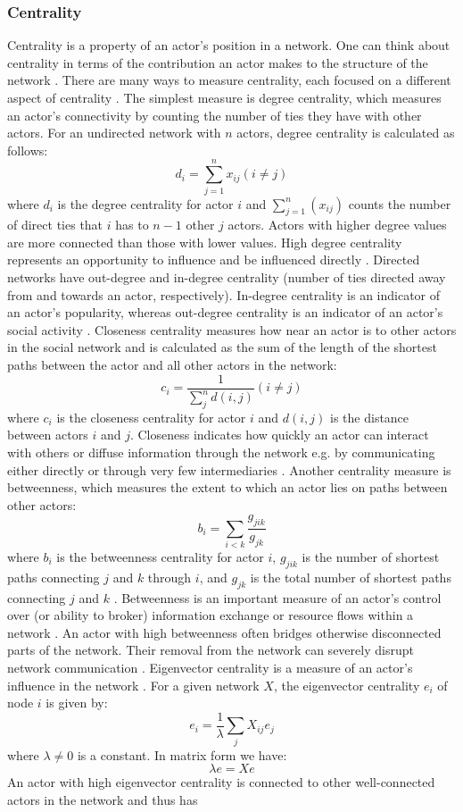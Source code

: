 \subsubsection{Centrality}

Centrality is a property of an actor's position in a network. One can think about centrality in terms of the contribution an actor makes to the structure of the network \citep{borgatti2013analyzing}. There are many ways to measure centrality, each focused on a different aspect of centrality \citep{freeman1979centrality}. The simplest measure is degree centrality, which measures an actor's connectivity by counting the number of ties they have with other actors. For an undirected network with \(n\) actors, degree centrality is calculated as follows: $$ d_i=\sum_{j=1}^{n}x_{ij}(i \neq j) $$ where $d_i$ is the degree centrality for actor $i$ and $\sum_{j=1}^{n}(x_{ij})$ counts the number of direct ties that $i$ has to $n-1$ other $j$ actors. Actors with higher degree values are more connected than those with lower values. High degree centrality represents an opportunity to influence and be influenced directly \citep{borgatti2013analyzing}. Directed networks have out-degree and in-degree centrality (number of ties directed away from and towards an actor, respectively). In-degree centrality is an indicator of an actor's popularity, whereas out-degree centrality is an indicator of an actor's social activity \citep{robins2015doing}. Closeness centrality measures how near an actor is to other actors in the social network and is calculated as the sum of the length of the shortest paths between the actor and all other actors in the network: $$c_i=\frac{1}{\sum_{j}^{n}d(i,j)}(i \neq j)$$ where $c_i$ is the closeness centrality for actor $i$ and $d(i,j)$ is the distance between actors $i$ and $j$. Closeness indicates how quickly an actor can interact with others or diffuse information through the network e.g. by communicating either directly or through very few intermediaries \citep{bavelas1950communication,freeman1979centrality,knoke2008social}. Another centrality measure is betweenness, which measures the extent to which an actor lies on paths between other actors: $$ b_i=\sum_{i < k}\frac{g_{jik}}{g_{jk}} $$ where $b_i$ is the betweenness centrality for actor $i$, $g_{jik}$ is the number of shortest paths connecting $j$ and $k$ through $i$, and $g_{jk}$ is the total number of shortest paths connecting $j$ and $k$ \citep{freeman1979centrality}. Betweenness is an important measure of an actor's control over (or ability to broker) information exchange or resource flows within a network \citep{knoke2008social,everett2016bridging}. An actor with high betweenness often bridges otherwise disconnected parts of the network. Their removal from the network can severely disrupt network communication \citep{borgatti2013analyzing}. Eigenvector centrality is a measure of an actor's influence in the network \citep{bonacich1987power}. For a given network $X$, the eigenvector centrality $e_{i}$ of node $i$ is given by: $$e_i = \frac{1}{\lambda} \sum_j X_{ij}e_j$$ where $\lambda \neq 0$ is a constant. In matrix form we have: $$\lambda e = Xe$$ An actor with high eigenvector centrality is connected to other well-connected actors in the network and thus has 